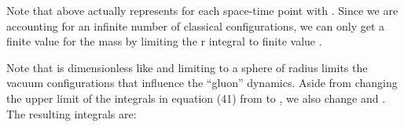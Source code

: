 \documentclass[a4paper,12pt]{article}
\begin{document}
Note that \coordHE{} above actually represents \coordHE{} for each space-time point \coordHE{} with \coordHE{}.  Since we are accounting for an infinite number of classical configurations, we can only get a finite value for the mass by limiting the r integral to finite value \myHighlight{$\Lambda$}\coordHE{}.


Note that \myHighlight{$\Lambda$}\coordHE{} is dimensionless like \myHighlight{$\sigma$}\coordHE{} and limiting \coordHE{} to a sphere of radius \myHighlight{$\Lambda$}\coordHE{} limits the vacuum configurations that influence the ``gluon'' dynamics.  Aside from changing the upper limit of the integrals in equation (41) from \myHighlight{$\infty$}\coordHE{} to \myHighlight{$\Lambda$}\coordHE{}, we also change \coordHE{} and \coordHE{}.  The resulting integrals are:
\end{document}
